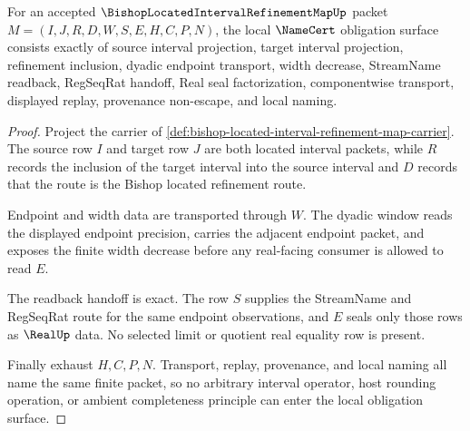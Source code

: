\begin{theorem}
\label{thm:bishop-located-interval-refinement-map-obligations}
For an accepted $\BishopLocatedIntervalRefinementMapUp$ packet $M=(I,J,R,D,W,S,E,H,C,P,N)$, the local $\NameCert$ obligation surface consists exactly of source interval projection, target interval projection, refinement inclusion, dyadic endpoint transport, width decrease, StreamName readback, RegSeqRat handoff, Real seal factorization, componentwise transport, displayed replay, provenance non-escape, and local naming.
\end{theorem}
\begin{proof}
Project the carrier of \autoref{def:bishop-located-interval-refinement-map-carrier}. The source row $I$ and target row $J$ are both located interval packets, while $R$ records the inclusion of the target interval into the source interval and $D$ records that the route is the Bishop located refinement route.

Endpoint and width data are transported through $W$. The dyadic window reads the displayed endpoint precision, carries the adjacent endpoint packet, and exposes the finite width decrease before any real-facing consumer is allowed to read $E$.

The readback handoff is exact. The row $S$ supplies the StreamName and RegSeqRat route for the same endpoint observations, and $E$ seals only those rows as $\RealUp$ data. No selected limit or quotient real equality row is present.

Finally exhaust $H,C,P,N$. Transport, replay, provenance, and local naming all name the same finite packet, so no arbitrary interval operator, host rounding operation, or ambient completeness principle can enter the local obligation surface.
\end{proof}


\begin{closurestatus}{\BishopLocatedIntervalRefinementMapUp}
  \theoryclosure{\seedClosure}
  \formalstatus{\unformalizedV}
\end{closurestatus}
